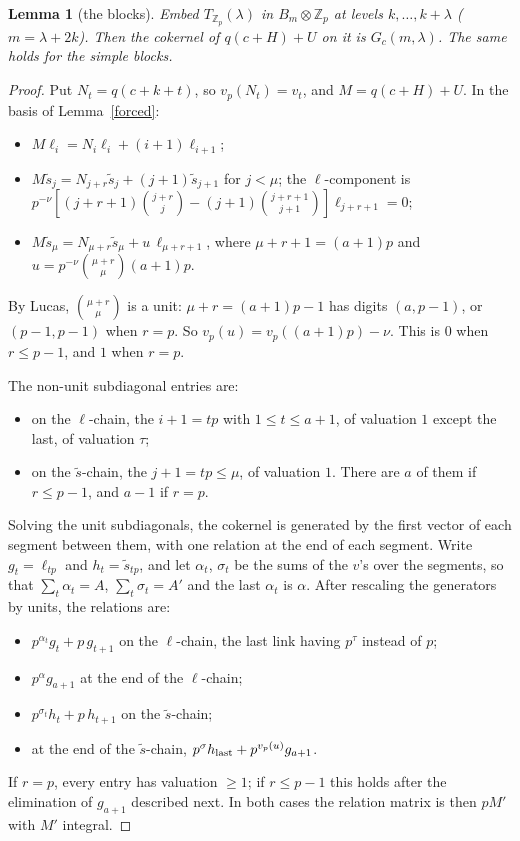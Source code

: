\documentclass[10pt]{article}
\theoremstyle{ds}
\newtheorem{lemma}{Lemma}
\theoremstyle{dsrem}
\newcommand{\Z}{\mathbb{Z}}
\begin{document}
\begin{lemma}[the blocks]\label{blocks}
Embed $T_{\Z_p}(\lambda)$ in $B_m\otimes\Z_p$ at levels $k,\dots,k+\lambda$ ($m=\lambda+2k$). Then the cokernel of $q(c+H)+U$ on it is $G_c(m,\lambda)$. The same holds for the simple blocks.
\end{lemma}

\begin{proof}
Put $N_t=q(c+k+t)$, so $v_p(N_t)=v_t$, and $M=q(c+H)+U$. In the basis of Lemma~\ref{forced}:
\begin{itemize}
\item $M\ell_i=N_i\ell_i+(i+1)\ell_{i+1}$;
\item $M\tilde s_j=N_{j+r}\tilde s_j+(j+1)\tilde s_{j+1}$ for $j<\mu$; the $\ell$-component is $p^{-\nu}[(j+r+1)\binom{j+r}{j}-(j+1)\binom{j+r+1}{j+1}]\ell_{j+r+1}=0$;
\item $M\tilde s_\mu=N_{\mu+r}\tilde s_\mu+u\,\ell_{\mu+r+1}$, where $\mu+r+1=(a+1)p$ and $u=p^{-\nu}\binom{\mu+r}{\mu}(a+1)p$.
\end{itemize}
By Lucas, $\binom{\mu+r}{\mu}$ is a unit: $\mu+r=(a+1)p-1$ has digits $(a,p-1)$, or $(p-1,p-1)$ when $r=p$. So $v_p(u)=v_p((a+1)p)-\nu$. This is $0$ when $r\le p-1$, and $1$ when $r=p$.

The non-unit subdiagonal entries are:
\begin{itemize}
\item on the $\ell$-chain, the $i+1=tp$ with $1\le t\le a+1$, of valuation $1$ except the last, of valuation $\tau$;
\item on the $\tilde s$-chain, the $j+1=tp\le\mu$, of valuation $1$. There are $a$ of them if $r\le p-1$, and $a-1$ if $r=p$.
\end{itemize}
Solving the unit subdiagonals, the cokernel is generated by the first vector of each segment between them, with one relation at the end of each segment. Write $g_t=\ell_{tp}$ and $h_t=\tilde s_{tp}$, and let $\alpha_t$, $\sigma_t$ be the sums of the $v$'s over the segments, so that $\sum_t\alpha_t=A$, $\sum_t\sigma_t=A'$ and the last $\alpha_t$ is $\alpha$. After rescaling the generators by units, the relations are:
\begin{itemize}
\item $p^{\alpha_t}g_t+p\,g_{t+1}$ on the $\ell$-chain, the last link having $p^{\tau}$ instead of $p$;
\item $p^{\alpha}g_{a+1}$ at the end of the $\ell$-chain;
\item $p^{\sigma_t}h_t+p\,h_{t+1}$ on the $\tilde s$-chain;
\item at the end of the $\tilde s$-chain, $p^{\sigma}h_{\rm last}+p^{v_p(u)}g_{a+1}$.
\end{itemize}
If $r=p$, every entry has valuation $\ge1$; if $r\le p-1$ this holds after the elimination of $g_{a+1}$ described next. In both cases the relation matrix is then $pM'$ with $M'$ integral.


\end{proof}
\end{document}
